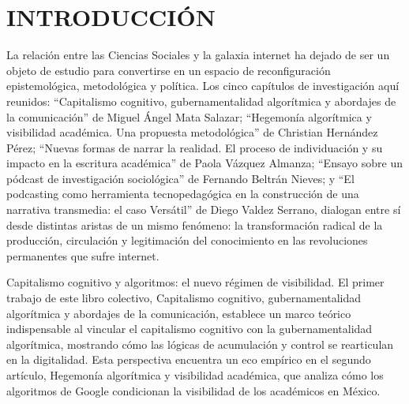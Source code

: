 \documentclass[
  spanish,
  11pt,
  a4paper,
]{scrbook}
\renewcommand*\contentsname{Tabla de contenidos}
\newcommand\contentsname{Tabla de contenidos}
\begin{document}
\renewcommand*\contentsname{Índice}
{
\setcounter{tocdepth}{1}
\tableofcontents
}

\mainmatter
{}

\chapter*{INTRODUCCIÓN}\label{introducciuxf3n}


\vspace{-\baselineskip}


La relación entre las Ciencias Sociales y la galaxia internet ha dejado
de ser un objeto de estudio para convertirse en un espacio de
reconfiguración epistemológica, metodológica y política. Los cinco
capítulos de investigación aquí reunidos: ``Capitalismo cognitivo,
gubernamentalidad algorítmica y abordajes de la comunicación'' de Miguel
Ángel Mata Salazar; ``Hegemonía algorítmica y visibilidad académica. Una
propuesta metodológica'' de Christian Hernández Pérez; ``Nuevas formas
de narrar la realidad. El proceso de individuación y su impacto en la
escritura académica'' de Paola Vázquez Almanza; ``Ensayo sobre un
pódcast de investigación sociológica'' de Fernando Beltrán Nieves; y
``El podcasting como herramienta tecnopedagógica en la construcción de
una narrativa transmedia: el caso Versátil'' de Diego Valdez Serrano,
dialogan entre sí desde distintas aristas de un mismo fenómeno: la
transformación radical de la producción, circulación y legitimación del
conocimiento en las revoluciones permanentes que sufre internet.

Capitalismo cognitivo y algoritmos: el nuevo régimen de visibilidad. El
primer trabajo de este libro colectivo, Capitalismo cognitivo,
gubernamentalidad algorítmica y abordajes de la comunicación, establece
un marco teórico indispensable al vincular el capitalismo cognitivo con
la gubernamentalidad algorítmica, mostrando cómo las lógicas de
acumulación y control se rearticulan en la digitalidad. Esta perspectiva
encuentra un eco empírico en el segundo artículo, Hegemonía algorítmica
y visibilidad académica, que analiza cómo los algoritmos de Google
condicionan la visibilidad de los académicos en México.
\end{document}
